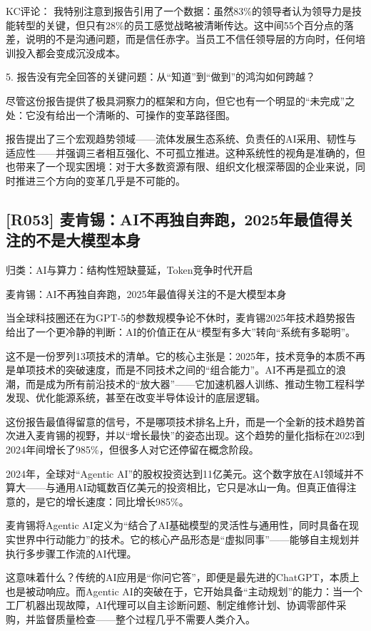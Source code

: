 \documentclass[11pt]{ctexart}
\begin{document}
KC评论： 我特别注意到报告引用了一个数据：虽然83\%的领导者认为领导力是技能转型的关键，但只有28\%的员工感觉战略被清晰传达。这中间55个百分点的落差，说明的不是沟通问题，而是信任赤字。当员工不信任领导层的方向时，任何培训投入都会变成沉没成本。

5. 报告没有完全回答的关键问题：从“知道”到“做到”的鸿沟如何跨越？

尽管这份报告提供了极具洞察力的框架和方向，但它也有一个明显的“未完成”之处：它没有给出一个清晰的、可操作的变革路径图。

报告提出了三个宏观趋势领域——流体发展生态系统、负责任的AI采用、韧性与适应性——并强调三者相互强化、不可孤立推进。这种系统性的视角是准确的，但也带来了一个现实困境：对于大多数资源有限、组织文化根深蒂固的企业来说，同时推进三个方向的变革几乎是不可能的。

\subsection{[R053] 麦肯锡：AI不再独自奔跑，2025年最值得关注的不是大模型本身}
{\small\color{refgray}归类：AI与算力：结构性短缺蔓延，Token竞争时代开启}

麦肯锡：AI不再独自奔跑，2025年最值得关注的不是大模型本身

当全球科技圈还在为GPT-5的参数规模争论不休时，麦肯锡2025年技术趋势报告给出了一个更冷静的判断：AI的价值正在从“模型有多大”转向“系统有多聪明”。

这不是一份罗列13项技术的清单。它的核心主张是：2025年，技术竞争的本质不再是单项技术的突破速度，而是不同技术之间的“组合能力”。AI不再是孤立的浪潮，而是成为所有前沿技术的“放大器”——它加速机器人训练、推动生物工程科学发现、优化能源系统，甚至在改变半导体设计的底层逻辑。

这份报告最值得留意的信号，不是哪项技术排名上升，而是一个全新的技术趋势首次进入麦肯锡的视野，并以“增长最快”的姿态出现。这个趋势的量化指标在2023到2024年间增长了985\%，但很多人对它还停留在概念阶段。

2024年，全球对“Agentic AI”的股权投资达到11亿美元。这个数字放在AI领域并不算大——与通用AI动辄数百亿美元的投资相比，它只是冰山一角。但真正值得注意的，是它的增长速度：同比增长985\%。

麦肯锡将Agentic AI定义为“结合了AI基础模型的灵活性与通用性，同时具备在现实世界中行动能力”的技术。它的核心产品形态是“虚拟同事”——能够自主规划并执行多步骤工作流的AI代理。

这意味着什么？传统的AI应用是“你问它答”，即便是最先进的ChatGPT，本质上也是被动响应。而Agentic AI的突破在于，它开始具备“主动规划”的能力：当一个工厂机器出现故障，AI代理可以自主诊断问题、制定维修计划、协调零部件采购，并监督质量检查——整个过程几乎不需要人类介入。
\end{document}

